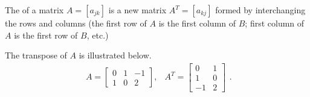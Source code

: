 The  of a matrix {$A=[a_{jk}]$} is a new matrix {$A^T=[a_{kj}]$} formed by interchanging the rows and columns (the first row of $A$ is the first column of $B$; first column of $A$ is the first row of $B$, etc.)
\begin{example} \label{ex transpose}
The transpose of $A$ is illustrated below.
$$\begin{array}{ccc}
A =\begin{bmatrix} 0&1&-1\\1&0&2
\end{bmatrix}, &
A^T = \begin{bmatrix} 0&1\\1&0
\\-1&2\end{bmatrix} 
\end{array}.$$
\end{example}
%
%
%



